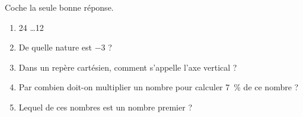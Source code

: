 %
%
    Coche la seule bonne réponse.
    \begin{enumerate}
        \item 24 \hspace{1em} \ldots \hspace{1em}12
        \item De quelle nature est \(-3\) ?
        \item Dans un repère cartésien, comment s'appelle l'axe vertical ?
        \item Par combien doit-on multiplier un nombre pour calculer \SI{7}{\%} de ce nombre ?
        \item Lequel de ces nombres est un nombre premier ?
              \begin{qcm}

\end{qcm}
\end{enumerate}

